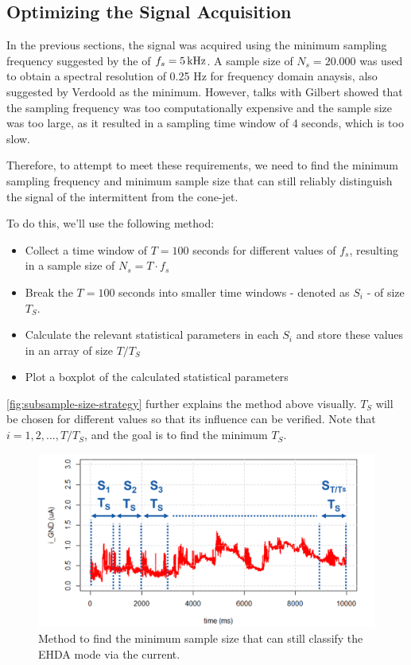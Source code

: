 \documentclass[oneside,12pt]{article}
\begin{document}
\subsection{Optimizing the Signal Acquisition}

In the previous sections, the signal was acquired using the minimum sampling frequency
suggested by the \cite{Verdoold2013} of $f_s = 5 \,\mathrm{kHz}$. A sample size of $N_s = 20.000$ was used to obtain a spectral resolution of 0.25 Hz
for frequency domain anaysis, also suggested by Verdoold as the minimum. However, talks with Gilbert showed that the sampling frequency was too
computationally expensive and the sample size was too large, as it resulted in a sampling time window of 4 seconds, which is too slow.

Therefore, to attempt to meet these requirements, we need to find the minimum sampling frequency and
minimum sample size that can still reliably distinguish the signal of the intermittent from the cone-jet.

To do this, we'll use the following method:

\begin{itemize}
    \item Collect a time window of $T = 100$ seconds for different values of $f_s$, resulting in a sample size of $N_s = T \cdot f_s$
    \item Break the $T = 100$ seconds into smaller time windows - denoted as $S_i$ - of size $T_S$. 
    \item Calculate the relevant statistical parameters in each $S_i$ and store these values in an array of size $T / T_S$
    \item Plot a boxplot of the calculated statistical parameters
\end{itemize}

\autoref{fig:subsample-size-strategy} further explains the method above visually. $T_S$ will be chosen for different values so that its influence
can be verified. Note that $i = 1, 2, ..., T / T_S$, and the goal is to find the minimum $T_S$.

\begin{figure}[h!]
    \centering
    \includegraphics[width=.8\textwidth,trim=1 1 1 1,clip]{figures/subsample-size-strategy.png}
    \caption{Method to find the minimum sample size that can still classify the EHDA mode via the current.}
    \label{fig:subsample-size-strategy}
\end{figure}
\end{document}

